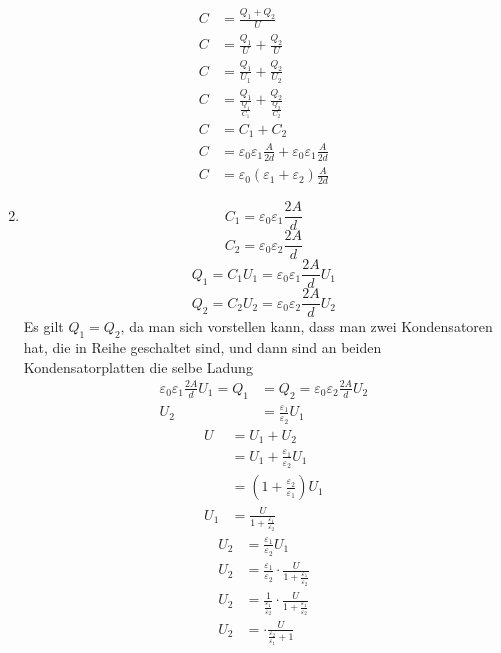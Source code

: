 \documentclass[sectionformat=aufgabe]{gadsescript}
\begin{document}
\begin{enumerate}[label=\alph*)]
\begin{align*}
			C &= \frac{ Q_1 + Q_2 }{ U }  \\
			C &= \frac{ Q_1 }{ U } + \frac{ Q_2 }{ U }  \\
			C &= \frac{ Q_1 }{ U_1 } + \frac{ Q_2 }{ U_2 }  \\
			C &= \frac{ Q_1 }{ \frac{ Q_1 }{ C_1 }  } + \frac{ Q_2 }{ \frac{ Q_2 }{ C_2 }  }  \\
			C &= C_1 + C_2 \\
			C &= \varepsilon _0 \varepsilon _1 \frac{ A }{ 2d } + \varepsilon _0 \varepsilon _1 \frac{ A }{ 2d }  \\
			C &= \varepsilon _0 \left(\varepsilon _1 + \varepsilon _2\right) \frac{ A }{ 2d }
		\end{align*}
	\item
		\[
			C_1 = \varepsilon_0 \varepsilon_1 \frac{ 2A }{ d }
		\]
		\[
			C_2 = \varepsilon _0 \varepsilon_2 \frac{ 2A }{ d } 
		\]
		\[
			Q_1 = C_1 U_1 = \varepsilon _0 \varepsilon _1 \frac{ 2A }{ d } U_1
		\]
		\[
			Q_2 = C_2 U_2 = \varepsilon _0 \varepsilon _2 \frac{ 2A }{ d } U_2
		\]
		Es gilt $ Q_1 = Q_2 $, da man sich vorstellen kann, dass man zwei Kondensatoren hat, die in Reihe geschaltet sind, und dann sind an beiden Kondensatorplatten die selbe Ladung
		\begin{align*}
			\varepsilon _0 \varepsilon _1 \frac{ 2A }{ d } U_1 = Q_1 &= Q_2 = \varepsilon _0 \varepsilon _2 \frac{ 2A }{ d } U_2 \\
			U_2 &= \frac{ \varepsilon _1 }{ \varepsilon _2 } U_1
		\end{align*}
		\begin{align*}
			U &= U_1 + U_2 \\
			~ &= U_1 + \frac{ \varepsilon _1 }{ \varepsilon _2 } U_1 \\
			~ &= \left( 1 + \frac{ \varepsilon _2 }{ \varepsilon _1 }  \right) U_1 \\
			U_1 &= \frac{ U }{ 1 + \frac{ \varepsilon _1 }{ \varepsilon _2 }  }
		\end{align*}
		\begin{align*}
			U_2 &= \frac{ \varepsilon _1 }{ \varepsilon _2 } U_1 \\
			U_2 &= \frac{ \varepsilon _1 }{ \varepsilon _2 } \cdot \frac{ U }{ 1 + \frac{ \varepsilon _1 }{ \varepsilon _2 }  }  \\
			U_2 &= \frac{ 1 }{ \frac{ \varepsilon _1 }{ \varepsilon _2 } } \cdot \frac{ U }{ 1 + \frac{ \varepsilon _1 }{ \varepsilon _2 }  }  \\
			U_2 &= \cdot \frac{ U }{ \frac{ \varepsilon _2 }{ \varepsilon _1 } + 1  }

\end{align*}
\end{enumerate}
\end{document}
